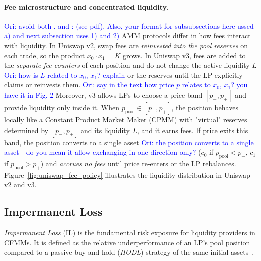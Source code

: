 \documentclass[journal]{IEEEtran}
\newcommand{\ori}[1]{\textcolor{blue}{Ori: #1}}
\begin{document}
\paragraph{Fee microstructure and concentrated liquidity.} \ori{avoid both . and : (see pdf). Also, your format for subsubsections here ussed a) and next subsection uses 1) and 2)}
AMM protocols differ in how fees interact with liquidity.
In Uniswap v2, swap fees are \emph{reinvested into the pool reserves} on each trade, so the product $x_0 \cdot x_1{=}K$ grows.
In Uniswap v3, fees are added to the \emph{separate fee counters} of each position and do not change the active liquidity $L$ \ori{how is $L$ related to $x_0$, $x_1$? explain} or the reserves until the LP explicitly claims or reinvests them. \ori{say in the text how price $p$ relates to $x_0$, $x_1$? you have it in Fig. 2}
Moreover, v3 allows LPs to choose a price band $[p_{-},p_{+}]$ and provide liquidity only inside it. When $p_{\text{pool}}\in[p_{-},p_{+}]$, the position behaves locally like a Constant Product Market Maker (CPMM) with "virtual" reserves determined by $[p_{-},p_{+}]$ and its liquidity $L$, and it earns fees. If price exits this band, the position converts to a single asset \ori{the position converts to a single asset - do you mean it allow exchanging in one direction only?} ($c_{0}$ if $p_{\text{pool}}<p_{-}$, $c_{1}$ if $p_{\text{pool}}>p_{+}$) and \emph{accrues no fees} until price re-enters or the LP rebalances. Figure~\ref{fig:uniswap_fee_policy} illustrates the liquidity distribution in Uniswap v2 and v3.




\subsection{Impermanent Loss}
\label{sec:background_il}

\emph{Impermanent Loss} (IL) is the fundamental risk exposure for liquidity providers in CFMMs. It is defined as the relative underperformance of an LP's pool position compared to a passive buy-and-hold (\emph{HODL}) strategy of the same initial assets~\cite{evans2021liquidity, aoyagi2020liquidity}.
\end{document}
